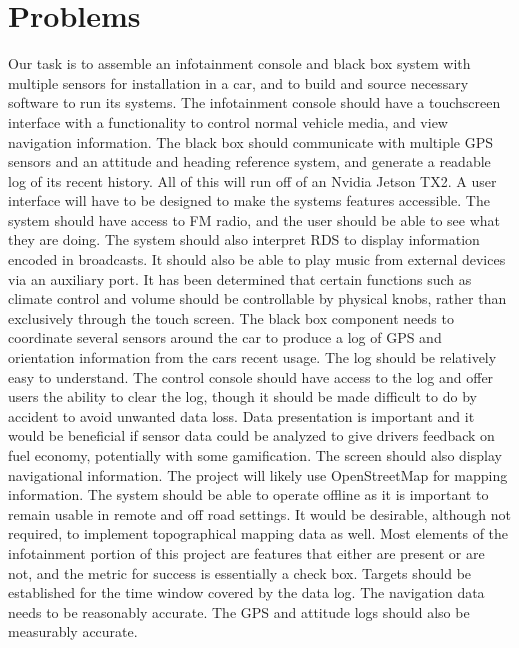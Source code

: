 \documentclass[onecolumn, draftclsnofoot,10pt, compsoc]{IEEEtran}
\begin{document}
\section{Problems}
Our task is to assemble an infotainment console and black box system with multiple sensors for installation in a car,
 and to build and source necessary software to run its systems. The infotainment console should have a touchscreen
  interface with a functionality to control normal vehicle media, and view navigation information.
	The black box should communicate with multiple GPS sensors and  an attitude and heading reference system,
	 and generate a readable log of its recent history. All of this will run off of an Nvidia Jetson TX2.
A user interface will have to be designed to make the systems features accessible. The system
should have access to FM radio, and the user should be able to see what they are doing.
The system should also interpret RDS to display information encoded in broadcasts.
It should also be able to play music from external devices via an auxiliary port. It has been
determined that certain functions such as climate control and volume should be controllable by
physical knobs, rather than exclusively through the touch screen.
The black box component needs to coordinate several sensors around the car to
produce a log of GPS and orientation information from the cars recent usage.
The log should be relatively easy to understand. The control console should have access
to the log and offer users the ability to clear the log, though it should be made difficult to do by
accident to avoid unwanted data loss. Data presentation is important and it would be beneficial if sensor
data could be analyzed to give drivers feedback on fuel economy, potentially with some gamification.
The screen should also display navigational information. The project will likely use OpenStreetMap for
mapping information. The system should be able to operate offline as it is important to remain usable
in remote and off road settings. It would be desirable, although not required, to implement topographical
mapping data as well.
Most elements of the infotainment portion of this project are features that
either are present or are not, and the metric for success is essentially a
check box. Targets should be established for the time window covered by the data log.
The navigation data needs to be reasonably accurate. The GPS and attitude logs should
 also be measurably accurate. 
\end{document}
